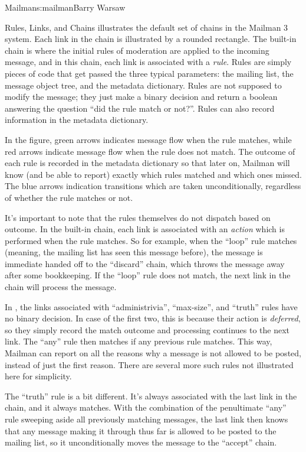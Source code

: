 \begin{aosachapter}{Mailman}{s:mailman}{Barry Warsaw}
\begin{aosasect1}{Rules, Links, and Chains}
 illustrates the default set of chains
in the Mailman 3 system.  Each link in the chain is illustrated by a
rounded rectangle.  The built-in chain is where the initial rules of
moderation are applied to the incoming message, and in this chain,
each link is associated with a \emph{rule}.  Rules are simply pieces
of code that get passed the three typical parameters: the mailing
list, the message object tree, and the metadata dictionary.  Rules are
not supposed to modify the message; they just make a binary decision
and return a boolean answering the question ``did the rule match or
not?''.  Rules can also record information in the metadata dictionary.

In the figure, green arrows indicates message flow when the rule
matches, while red arrows indicate message flow when the rule does not
match.  The outcome of each rule is recorded in the metadata
dictionary so that later on, Mailman will know (and be able to report)
exactly which rules matched and which ones missed.  The blue arrows
indication transitions which are taken unconditionally, regardless of
whether the rule matches or not.


It's important to note that the rules themselves do not dispatch based
on outcome.  In the built-in chain, each link is associated with an
\emph{action} which is performed when the rule matches.  So for
example, when the ``loop'' rule matches (meaning, the mailing list has
seen this message before), the message is immediate handed off to the
``discard'' chain, which throws the message away after some
bookkeeping.  If the ``loop'' rule does not match, the next link in
the chain will process the message.

In , the links associated with
``administrivia'', ``max-size'', and ``truth'' rules have no binary
decision.  In case of the first two, this is because their action is
\emph{deferred}, so they simply record the match outcome and
processing continues to the next link.  The ``any'' rule then matches
if any previous rule matches.  This way, Mailman can report on all the
reasons why a message is not allowed to be posted, instead of just the
first reason.  There are several more such rules not illustrated here
for simplicity.

The ``truth'' rule is a bit different.  It's always associated with
the last link in the chain, and it always matches.  With the
combination of the penultimate ``any'' rule sweeping aside all
previously matching messages, the last link then knows that any
message making it through thus far is allowed to be posted to the
mailing list, so it unconditionally moves the message to the
``accept'' chain.


\end{aosasect1}
\end{aosachapter}
